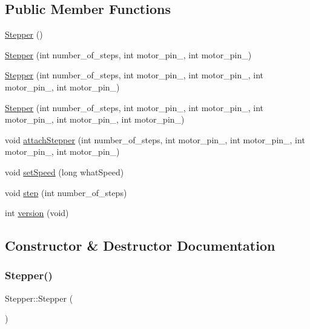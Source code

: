 \subsection*{Public Member Functions}
\begin{DoxyCompactItemize}
\item 
\hyperlink{class_stepper_af3be15bfd38efba27858cc5ec00d84b9}{Stepper} ()
\item 
\hyperlink{class_stepper_a83820948727cdebcbd7a9c76208030fa}{Stepper} (int number\+\_\+of\+\_\+steps, int motor\+\_\+pin\+\_, int motor\+\_\+pin\+\_)
\item 
\hyperlink{class_stepper_a7d1a0a0efbed9fb6134b88236b8bd361}{Stepper} (int number\+\_\+of\+\_\+steps, int motor\+\_\+pin\+\_, int motor\+\_\+pin\+\_, int motor\+\_\+pin\+\_, int motor\+\_\+pin\+\_)
\item 
\hyperlink{class_stepper_a3e32f55782ccfac006c3cbd357302707}{Stepper} (int number\+\_\+of\+\_\+steps, int motor\+\_\+pin\+\_, int motor\+\_\+pin\+\_, int motor\+\_\+pin\+\_, int motor\+\_\+pin\+\_, int motor\+\_\+pin\+\_)
\item 
void \hyperlink{class_stepper_a3f68ee9b26d4076133ebfe070ec0b37c}{attach\+Stepper} (int number\+\_\+of\+\_\+steps, int motor\+\_\+pin\+\_, int motor\+\_\+pin\+\_, int motor\+\_\+pin\+\_, int motor\+\_\+pin\+\_)
\item 
void \hyperlink{class_stepper_a89a1f8b30656437bba8732721d5671e2}{set\+Speed} (long what\+Speed)
\item 
void \hyperlink{class_stepper_a23f1ada8f077bcb8691009648cf29f27}{step} (int number\+\_\+of\+\_\+steps)
\item 
int \hyperlink{class_stepper_a2b737f8eb9641728af2fb1c24a2560da}{version} (void)
\end{DoxyCompactItemize}


\subsection{Constructor \& Destructor Documentation}
\mbox{\label{class_stepper_af3be15bfd38efba27858cc5ec00d84b9}} 
\subsubsection{\texorpdfstring{Stepper()}{Stepper()}\hspace{0.1cm}{\footnotesize\ttfamily [1/4]}}
{\footnotesize\ttfamily Stepper\+::\+Stepper (\begin{DoxyParamCaption}{ }\end{DoxyParamCaption})}

